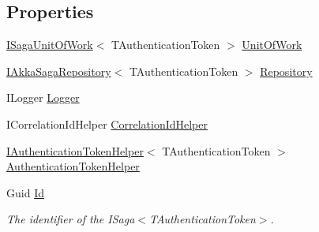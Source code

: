 \subsection*{Properties}
\begin{DoxyCompactItemize}
\item 
\hyperlink{interfaceCqrs_1_1Domain_1_1ISagaUnitOfWork}{I\+Saga\+Unit\+Of\+Work}$<$ T\+Authentication\+Token $>$ \hyperlink{classCqrs_1_1Akka_1_1Domain_1_1AkkaSaga_addbf93da18d577da8f8f1e2dba5cafb9_addbf93da18d577da8f8f1e2dba5cafb9}{Unit\+Of\+Work}
\item 
\hyperlink{interfaceCqrs_1_1Akka_1_1Domain_1_1IAkkaSagaRepository}{I\+Akka\+Saga\+Repository}$<$ T\+Authentication\+Token $>$ \hyperlink{classCqrs_1_1Akka_1_1Domain_1_1AkkaSaga_a4c0662a1aa78c8de5fa32c71a54cf393_a4c0662a1aa78c8de5fa32c71a54cf393}{Repository}
\item 
I\+Logger \hyperlink{classCqrs_1_1Akka_1_1Domain_1_1AkkaSaga_acbb9a6e1cde3e2846270a8fe3f55bc92_acbb9a6e1cde3e2846270a8fe3f55bc92}{Logger}
\item 
I\+Correlation\+Id\+Helper \hyperlink{classCqrs_1_1Akka_1_1Domain_1_1AkkaSaga_a11d543b42aa6e55644c2b349336e962a_a11d543b42aa6e55644c2b349336e962a}{Correlation\+Id\+Helper}
\item 
\hyperlink{interfaceCqrs_1_1Authentication_1_1IAuthenticationTokenHelper}{I\+Authentication\+Token\+Helper}$<$ T\+Authentication\+Token $>$ \hyperlink{classCqrs_1_1Akka_1_1Domain_1_1AkkaSaga_a18e4d7faa9cd9d10ac2ac0bd3b6c9fc9_a18e4d7faa9cd9d10ac2ac0bd3b6c9fc9}{Authentication\+Token\+Helper}
\item 
Guid \hyperlink{classCqrs_1_1Akka_1_1Domain_1_1AkkaSaga_a98fa8a5ebc587bc02b1c98d5ffbc997e_a98fa8a5ebc587bc02b1c98d5ffbc997e}{Id}
\begin{DoxyCompactList}\small\item\em The identifier of the I\+Saga$<$\+T\+Authentication\+Token$>$. \end{DoxyCompactList}\item 

\end{DoxyCompactItemize}
